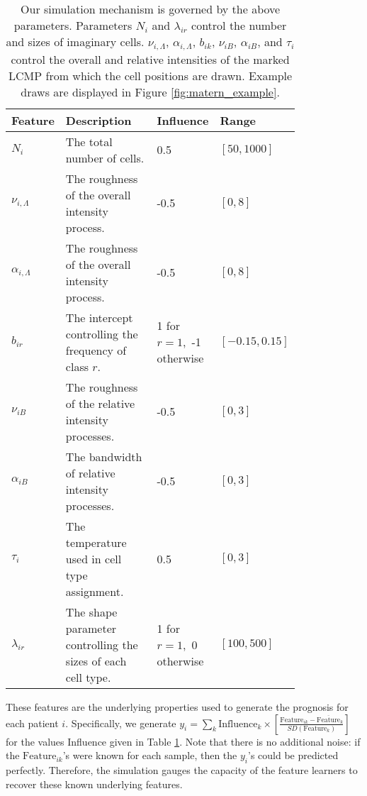 \begin{table}[]
\begin{tabular}{|p{0.1\linewidth}|p{0.4\linewidth}|p{0.16\linewidth}|p{0.15\linewidth}|}
\hline
\textbf{Feature}              & \textbf{Description}                                 & \textbf{Influence}          & \textbf{Range}             \\
\hline
$N_i$                & The total number of cells.                                    & 0.5                         & $\left[50, 1000\right]$    \\
\hline
$\nu_{i,\Lambda}$    & The roughness of the overall intensity process.            & -0.5                        & $\left[0, 8\right]$        \\
\hline
$\alpha_{i,\Lambda}$ & The roughness of the overall intensity process.            & -0.5                        & $\left[0, 8\right]$        \\
\hline
$b_{ir}$             & The intercept controlling the frequency of class $r$. & 1 for $r = 1$,\ -1 otherwise & $\left[-0.15, 0.15\right]$ \\
\hline
$\nu_{iB}$           & The roughness of the relative intensity processes.            & -0.5                        & $\left[0, 3\right]$        \\
\hline
$\alpha_{iB}$        & The bandwidth of relative intensity processes.                & -0.5                        & $\left[0, 3\right]$        \\
\hline
$\tau_{i}$           & The temperature used in cell type assignment.                 & 0.5                         & $\left[0, 3\right]$        \\
\hline
$\lambda_{ir}$       & The shape parameter controlling the sizes of each cell type.  & 1 for $r = 1$,\ 0 otherwise  & $\left[100, 500\right]$   \\
\hline
\end{tabular}
\caption{Our simulation mechanism is governed by the above parameters.
  Parameters $N_i$ and $\lambda_{ir}$ control the number and sizes of imaginary
  cells. $\nu_{i, \Lambda}$, $\alpha_{i, \Lambda}$, $b_{ik}$, $\nu_{iB}$,
  $\alpha_{iB}$, and $\tau_{i}$ control the overall and relative intensities of
  the marked LCMP from which the cell positions are drawn. Example draws are
  displayed in Figure \ref{fig:matern_example}.}
\label{tab:sim_params}
\end{table}

These features are the underlying properties used to generate the prognosis for
each patient $i$. Specifically, we generate $y_i = \sum_{k} \text{Influence}_{k}
\times \left[\frac{\text{Feature}_{ik} -
    \overline{\text{Feature}}_{k}}{SD\left(\text{Feature}_{k}\right)}\right]$ for the
values Influence given in Table \ref{tab:sim_params}. Note that there is no
additional noise: if the $\text{Feature}_{ik}$'s were known for each sample,
then the $y_{i}$'s could be predicted perfectly. Therefore, the simulation
gauges the capacity of the feature learners to recover these known underlying
features.

